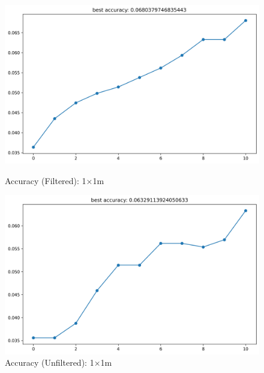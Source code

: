 \documentclass[runningheads]{llncs}
\begin{document}
\begin{figure}[H]
	\centering
	\begin{minipage}{0.49\textwidth}
		\centering
		\includegraphics[width=\textwidth]{figures/filtered/svm_acc_1.png}
		\caption*{Accuracy (Filtered): 1×1m}
	\end{minipage}
	\hfill
	\begin{minipage}{0.49\textwidth}
		\centering
		\includegraphics[width=\textwidth]{figures/unfiltered/svm_acc_1.png}
		\caption*{Accuracy (Unfiltered): 1×1m}
	\end{minipage}
\end{figure}
\end{document}
